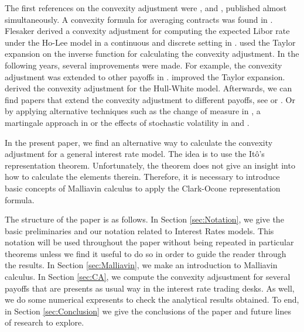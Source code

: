 \documentclass[a4paper,10pt]{article}
\newcommand{\1}{\mathbf{1}}
\begin{document}
The first references on the convexity adjustment were \cite{RitchkenS}, \cite{Flesaker} and \cite{BrothertonIben}, published almost simultaneously. A convexity formula for averaging contracts was found in \cite{RitchkenS}. Flesaker derived a convexity adjustment for computing the expected Libor rate under the Ho-Lee model in a continuous and discrete setting in \cite{Flesaker}. \cite{BrothertonIben} used the Taylor expansion on the inverse function for calculating the convexity adjustment. In the following years, several improvements were made. For example, the convexity adjustment was extended to other payoffs in \cite{Hull06}. \cite{Hart} improved the Taylor expansion. \cite{KirikosNovak} derived the convexity adjustment for the Hull-White model. Afterwards, we can find papers that extend the convexity adjustment to different payoffs, see \cite{Benhamou00WC} or \cite{Hagan03}. Or by applying alternative techniques such as the change of measure in \cite{Pelsser}, a martingale approach in \cite{Benhamou00} or the effects of stochastic volatility in \cite{PiterbargRenedo} and \cite{HaganWoodward20}.

In the present paper, we find an alternative way to calculate the convexity adjustment for a general interest rate model. The idea is to use the It\^o's representation theorem. Unfortunately, the theorem does not give an insight into how to calculate the elements therein. Therefore, it is necessary to introduce basic concepts of Malliavin calculus to apply the Clark-Ocone representation formula.

The structure of the paper is as follows. In Section \ref{sec:Notation}, we give the basic preliminaries and our notation related to Interest Rates models. This notation will be used throughout the paper without being repeated in particular theorems unless we find it useful to do so in order to guide the reader through the results. In Section \ref{sec:Malliavin}, we make an introduction to Malliavin calculus. In Section \ref{sec:CA}, we compute the convexity adjsustment for several payoffs that are presents as usual way in the interest rate trading desks. As well, we do some numerical expresents to check the analytical results obtained. To end, in Section \ref{sec:Conclusion} we give the conclusions of the paper and future lines of research to explore.
\end{document}
